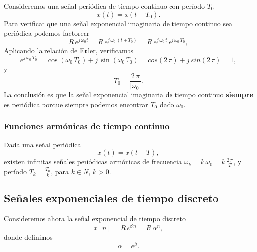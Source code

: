 Consideremos una se\~{n}al peri\'{o}dica de tiempo continuo con período $T_{0}$
\begin{equation}
  x\left( t\right) = x\left( t+T_{0}\right) .
\end{equation}
Para verificar que una se\~{n}al exponencial imaginaria de tiempo continuo sea
peri\'{o}dica podemos factorear
\begin{equation}
  R \, e^{j \, \omega_{0} \, t}= 
  R \, e^{j \, \omega_{0} \, \left(t+T_{0}\right)}= 
  R \, e^{j \, \omega_{0} \, t} \, e^{j \, \omega_{0} \, T_{0}},
\end{equation}
Aplicando la relación de Euler, verificamos
\begin{equation}
  e^{j \, \omega_{0} \, T_{0}}=
  \cos \left( \omega_{0} \, T_{0}\right) +
  j \, \sin \left(\omega_{0} \, T_{0}\right) = cos(2 \, \pi) + j \, sin(2 \, \pi) = 1,
\end{equation}
y
\begin{equation} 
  T_{0} = \frac{2 \, \pi }{\left|\omega_{0}\right| }.
\end{equation}
La conclusi\'{o}n es que la se\~{n}al exponencial imaginaria de tiempo
continuo \textbf{siempre} es peri\'{o}dica porque siempre podemos
encontrar $T_{0}$ dado $\omega_{0}$.

\subsubsection{Funciones arm\'{o}nicas de tiempo continuo} 

Dada una se\~{n}al peri\'{o}dica
\begin{equation}
  x(t) = x(t + T),
\end{equation}
existen infinitas se\~{n}ales peri\'{o}dicas arm\'{o}nicas de frecuencia $\omega_{k} = k \, \omega_{0} = k \, \frac{2 \, \pi}{T}$,
y período $T_{k} = \frac{T_{0}}{k}$, para $k \in N$, $k > 0$.


\subsection{Se\~{n}ales exponenciales de tiempo discreto}

Consideremos ahora la se\~{n}al exponencial de tiempo discreto
\begin{equation}
  x\left[ n\right] = R \, e^{\beta \, n} = R \, \alpha^{n},
\end{equation}
donde definimos
\begin{equation}
  \alpha = e^{\beta}.
\end{equation}


